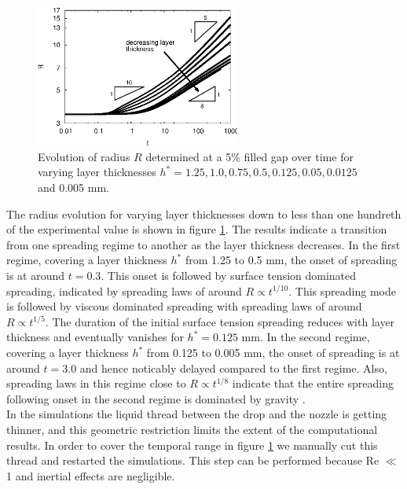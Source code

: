 \documentclass[aip,graphicx]{revtex4-1}
\begin{document}
\begin{figure}[!ht]
\centering
\includegraphics[width=0.6\textwidth]{figures/radius_vs_time_before_and_after_pinch_off.eps}
\caption{Evolution of radius $R$ determined at a 5\% filled gap over time for varying layer thicknesses $h^*=1.25, 1.0, 0.75, 0.5, 0.125, 0.05, 0.0125$ and 0.005 mm.}
\label{fig:radius_vs_time_before_and_after_pinch_off}
\end{figure}

The radius evolution for varying layer thicknesses down to less than one hundreth of the experimental value is shown in figure \ref{fig:radius_vs_time_before_and_after_pinch_off}.
The results indicate a transition from one spreading regime to another as the layer thickness decreases.
In the first regime, covering a layer thickness $h^*$ from 1.25 to 0.5 mm, the onset of spreading is at around $t=0.3$.
This onset is followed by surface tension dominated spreading, indicated by spreading laws of around $R \propto t^{1/10}$.
This spreading mode is followed by viscous dominated spreading with spreading laws of around $R \propto t^{1/5}$.
The duration of the initial surface tension spreading reduces with layer thickness and eventually vanishes for $h^*=0.125$ mm.
In the second regime, covering a layer thickness $h^*$ from 0.125 to 0.005 mm, the onset of spreading is at around $t=3.0$ and hence noticably delayed compared to the first regime.
Also, spreading laws in this regime close to $R \propto t^{1/8}$ indicate that the entire spreading following onset in the second regime is dominated by gravity \cite{cazabat1986dynamics}. \\


In the simulations the liquid thread between the drop and the nozzle is getting thinner, and this geometric restriction limits the extent of the computational results.
In order to cover the temporal range in figure \ref{fig:radius_vs_time_before_and_after_pinch_off} we manually cut this thread and restarted the simulations.
This step can be performed because Re $\ll$ 1 and inertial effects are negligible.
\end{document}

